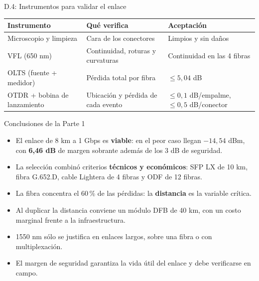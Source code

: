 \begin{frame}{D.4: Instrumentos para validar el enlace}
  \small
  \begin{tabular}{>{\raggedright\arraybackslash}p{3.2cm}>{\raggedright\arraybackslash}p{3.9cm}>{\raggedright\arraybackslash}p{3.3cm}}
    \toprule
    \textbf{Instrumento} & \textbf{Qué verifica} & \textbf{Aceptación} \\
    \midrule
    Microscopio y limpieza & Cara de los conectores & Limpios y sin daños \\
    VFL (650 nm) & Continuidad, roturas y curvaturas & Continuidad en las 4 fibras \\
    OLTS (fuente + medidor) & Pérdida total por fibra & $\leq 5{,}04$ dB \\
    OTDR + bobina de lanzamiento & Ubicación y pérdida de cada evento & $\leq 0{,}1$ dB/empalme, $\leq 0{,}5$ dB/conector \\
    \bottomrule
  \end{tabular}
\end{frame}

\begin{frame}{Conclusiones de la Parte 1}
  \begin{itemize}
    \item El enlace de 8 km a 1 Gbps es \textbf{viable}: en el peor caso llegan $-14{,}54$ dBm, con \textbf{6,46 dB} de margen sobrante además de los 3 dB de seguridad.
    \item La selección combinó criterios \textbf{técnicos y económicos}: SFP LX de 10 km, fibra G.652.D, cable Lightera de 4 fibras y ODF de 12 fibras.
    \item La fibra concentra el 60\,\% de las pérdidas: la \textbf{distancia} es la variable crítica.
    \item Al duplicar la distancia conviene un módulo DFB de 40 km, con un costo marginal frente a la infraestructura.
    \item 1550 nm sólo se justifica en enlaces largos, sobre una fibra o con multiplexación.
    \item El margen de seguridad garantiza la vida útil del enlace y debe verificarse en campo.
  \end{itemize}
\end{frame}
